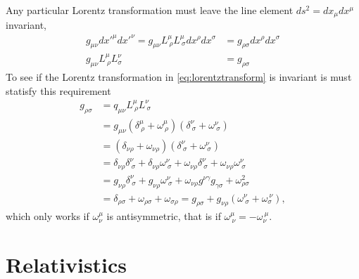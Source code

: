 \documentclass[11pt]{amsart}
\begin{document}
Any particular Lorentz transformation must leave the line element $ds^2 = dx_{\mu}dx^{\mu}$ invariant,
\begin{align*}
g_{\mu\nu}dx'^{\mu}dx'^{\nu} = g_{\mu\nu} L^\mu_{\ \rho} L^\mu_{\ \sigma}dx^\rho dx^\sigma 
											&= g_{\rho\sigma}dx^\rho dx^\sigma \\
g_{\mu\nu}L^{\mu}_{\ \rho}L^{\nu}_{\sigma}	&= g_{\rho\sigma}
\end{align*}
To see if the Lorentz transformation in \ref{eq:lorentztransform} is invariant is must statisfy this requirement
\begin{align*}
g_{\rho\sigma}  &= q_{\mu\nu}L^{\mu}_{\ \rho}L^{\nu}_{\ \sigma} \\
			&= g_{\mu\nu}(\delta^{\mu}_{\ \rho} + \omega^{\mu}_{\ \rho})(\delta^{\nu}_{\ \sigma} + \omega^{\nu}_{\ \sigma}) \\
			&= (\delta_{\nu\rho} + \omega_{\nu\rho})(\delta^{\nu}_{\ \sigma} + \omega^{\nu}_{\ \sigma}) \\
			&= \delta_{\nu\rho}\delta^{\nu}_{\ \sigma} + \delta_{\nu\rho}\omega^{\nu}_{\ \sigma} + \omega_{\nu\rho}\delta^{\nu}_{\ \sigma} + \omega_{\nu\rho}\omega^{\nu}_{\ \sigma} \\
			&= g_{\nu\rho}\delta^{\nu}_{\ \sigma} + g_{\nu\rho}\omega^{\nu}_{\ \sigma} + \omega_{\nu\rho}g^{\nu\gamma} g_{\gamma\sigma} + \omega^2_{\rho\sigma} \\
			& = \delta_{\rho\sigma} + \omega_{\rho\sigma} + \omega_{\sigma\rho} = g_{\rho\sigma} + g_{\nu\rho}(\omega^{\nu}_{\ \sigma} + \omega_{\sigma}^{\ \nu}),
\end{align*}
which only works if $\omega^{\mu}_{\nu}$ is antisymmetric, that is if $\omega^{\mu}_{\ \nu} = -\omega_{\nu}^{\ \mu}$.

\section{Relativistics}
\end{document}
